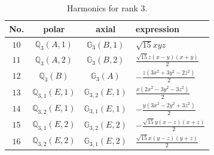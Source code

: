 \documentclass[fleqn,8pt,landscape]{jsarticle}
\begin{document}
\begin{table}[ht!]
\begin{center}
\caption{Harmonics for rank 3.}
\renewcommand{\arraystretch}{1.3}
\begin{tabular}{cccl} \hline \hline
No. & polar & axial & expression \\ \hline
$ 10 $ & $ \mathbb{Q}_{3}(A,1) $ & $ \mathbb{G}_{3}(B,1) $ & $ \sqrt{15} x y z $ \\
$ 11 $ & $ \mathbb{Q}_{3}(A,2) $ & $ \mathbb{G}_{3}(B,2) $ & $ \frac{\sqrt{15} z \left(x - y\right) \left(x + y\right)}{2} $ \\
$ 12 $ & $ \mathbb{Q}_{3}(B) $ & $ \mathbb{G}_{3}(A) $ & $ - \frac{z \left(3 x^{2} + 3 y^{2} - 2 z^{2}\right)}{2} $ \\
$ 13 $ & $ \mathbb{Q}_{3,1}(E,1) $ & $ \mathbb{G}_{3,2}(E,1) $ & $ \frac{x \left(2 x^{2} - 3 y^{2} - 3 z^{2}\right)}{2} $ \\
$ 14 $ & $ \mathbb{Q}_{3,2}(E,1) $ & $ \mathbb{G}_{3,1}(E,1) $ & $ - \frac{y \left(3 x^{2} - 2 y^{2} + 3 z^{2}\right)}{2} $ \\
$ 15 $ & $ \mathbb{Q}_{3,1}(E,2) $ & $ \mathbb{G}_{3,2}(E,2) $ & $ - \frac{\sqrt{15} y \left(x - z\right) \left(x + z\right)}{2} $ \\
$ 16 $ & $ \mathbb{Q}_{3,2}(E,2) $ & $ \mathbb{G}_{3,1}(E,2) $ & $ \frac{\sqrt{15} x \left(y - z\right) \left(y + z\right)}{2} $ \\
 \hline \hline
\end{tabular}
\end{center}
\end{table}
\end{document}

